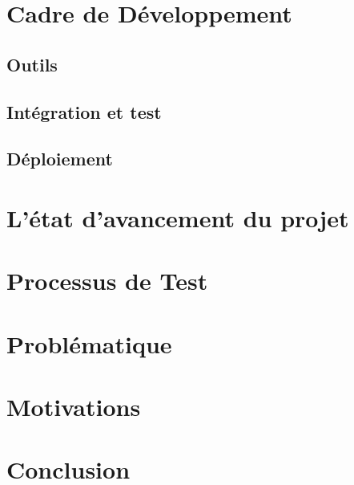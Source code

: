 \section{Cadre de Développement}

\subsection{Outils}

\subsection{Intégration et test}

\subsection{Déploiement}

\section{L'état d'avancement du projet}

\clearpage

\section{Processus de Test}

\section{Problématique}

\section{Motivations}

\section{Conclusion}
